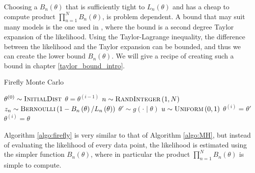Choosing a $B_n\left(\theta\right)$ that is sufficiently tight to $L_n\left(\theta\right)$ and has a cheap to compute product $\prod_{n=1}^N B_n\left(\theta\right)$, is problem dependent. A bound that may suit many models is the one used in \cite{Bardenet:1}, where the bound is a second degree Taylor  expansion of the likelihood. Using the Taylor-Lagrange inequality, the difference between the likelihood and the Taylor expansion can be bounded, and thus we can create the lower bound $B_n\left(\theta\right)$. We will give a recipe of creating such a bound in chapter \ref{taylor_bound_intro}.    


\begin{algorithm}[H]
    \caption{Firefly Monte Carlo}
    \label{algo:firefly}
    \begin{algorithmic}[1] %
        \State $\theta^{\left(0\right)} \sim \textsc{InitialDist}$ 
        \State $\theta = \theta^{\left(i-1\right)}$
        \State $n\sim \textsc{RandInteger}\left(1, N\right)$
        \State $z_n \sim \textsc{Bernoulli}\left(1 - B_n\left(\theta\right)/L_n\left(\theta\right)\right) $ \label{algo:firefly:z}
        \EndFor
        \State$\theta' \sim g\left(\cdot\mid\theta\right)$
        \State $u\sim \textsc{Uniform}\left(0,1\right)$
         \label{algo:firefly:accept_reject}
        \State $\theta^{\left(i\right)} = \theta '$
        \Else 
        \State $\theta^{\left(i\right)} = \theta$
         \EndIf
         \EndFor

    \end{algorithmic}
\end{algorithm}
Algorithm \ref{algo:firefly} is very similar to that of Algorithm \ref{algo:MH}, but instead of evaluating the likelihood of every data point, the likelihood is estimated using the simpler function $B_n\left(\theta\right)$, where in particular the product $\prod_{n=1}^N B_n\left(\theta\right)$ is simple to compute.
